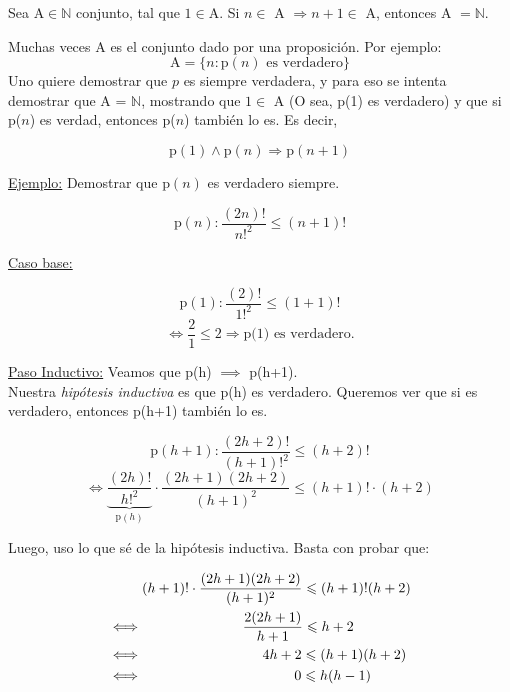 \documentclass[../main.tex]{subfiles}
\begin{document}
Sea $\text{A} \in \mathbb{N}$ conjunto, tal que $1 \in \text{A}$. Si $n \in$ A $\Rightarrow n+1 \in $ A, entonces A $= \mathbb{N}$.

Muchas veces A es el conjunto dado por una proposición. Por ejemplo:
\begin{equation*}
    \text{A} = \{n:\text{p}(n) \text{ es verdadero}\}
\end{equation*}
Uno quiere demostrar que $p$ es siempre verdadera, y para eso se intenta demostrar que A = $\mathbb{N}$, mostrando que $1 \in $ A (O sea, p(1) es verdadero) y que si p($n$) es verdad, entonces p($n$) también lo es. Es decir,

\begin{equation*}
    \text{p}(1) \land \text{p}(n) \Longrightarrow \text{p}(n+1)
\end{equation*}

\nln

\ul{Ejemplo:} Demostrar que $\text{p}(n)$ es verdadero siempre.

\begin{equation}
    \text{p}(n): \frac{(2n)!}{n!^2} \leqslant (n+1)!
\end{equation}
\nln 

\ul{Caso base:} 

\begin{equation}
    \text{p}(1): \frac{(2)!}{1!^2} \leqslant (1+1)!
\end{equation}
\begin{equation*}
    \iff \frac{2}{1} \leqslant 2 \Longrightarrow \text{p(1) es verdadero.}
\end{equation*}
\nln

\ul{Paso Inductivo:} Veamos que p(h) $\implies$ p(h+1). \\
Nuestra \textit{hipótesis inductiva} es que p(h) es verdadero. Queremos ver que si es verdadero, entonces p(h+1) también lo es.

\nln
\begin{equation}
    \text{p}(h+1) : \frac{(2h+2)!}{(h+1)!^2} \leqslant (h+2)!
\end{equation}
\begin{equation*}
   \iff \underbrace {\frac{(2h)!}{h!^2}}_{\text{p}(h)} \cdot \frac{(2h+1)(2h+2)}{(h+1)^2} \leqslant (h+1)! \cdot (h+2)
\end{equation*}
\nln

Luego, uso lo que sé de la hipótesis inductiva. Basta con probar que:

\begin{align*}
         & (h+1)! \cdot \frac{(2h+1)(2h+2)}{(h+1)^2}    \leqslant (h+1)!(h+2)   \\ 
    \iff & \hspace{25.3mm} \frac{2(2h+1)}{h+1}      \leqslant h+2               \\
    \iff & \hspace{30.3mm} 4h+2 \leqslant (h+1)(h+2)                            \\
    \iff & \hspace{38.3mm} 0 \leqslant h(h-1)
\end{align*}
\\
\end{document}

